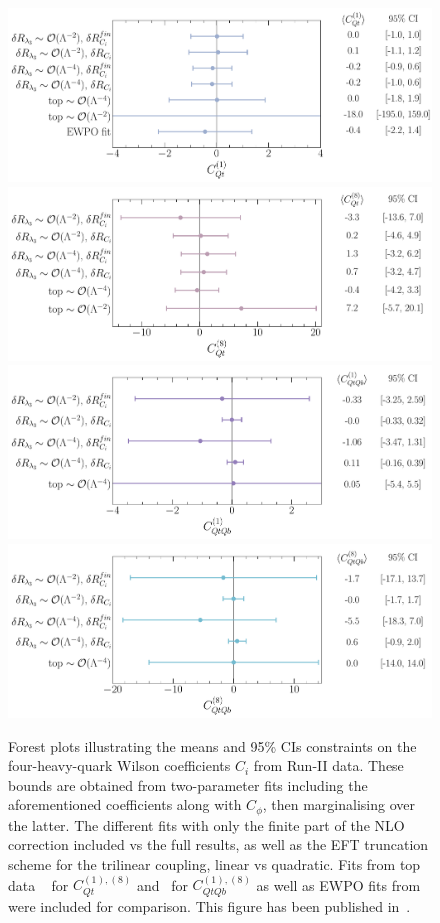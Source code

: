 	\begin{figure}[htpb!]
		\vspace*{-0.5cm}
		\begin{center}
			\includegraphics[width=0.75\linewidth]{fig/uebeblick_Cqt1}
			\includegraphics[width=0.75\linewidth]{fig/uebeblick_Cqt8} 
			\includegraphics[width=0.75\linewidth]{fig/uebeblick_Cqtqb1}
			\includegraphics[width=0.75\linewidth]{fig/uebeblick_Cqtqb8}
		\end{center}
		\vspace*{-0.5cm}
		\caption{Forest plots illustrating the means and 95\% CIs constraints on the four-heavy-quark Wilson coefficients $C_i$ from Run-II data. These bounds are obtained from two-parameter fits including the aforementioned coefficients along with $C_\phi$, then marginalising over the latter. The different fits with only the finite part of the NLO correction included vs the full results, as well as the EFT truncation scheme for the trilinear coupling, linear vs quadratic. Fits from top data ~\cite{Ethier:2021bye} for $C_{Qt}^{(1),(8)}$ and~\cite{Hartland:2019bjb} for $C_{QtQb}^{(1),(8)}$ as well as EWPO fits from~\cite{Dawson:2022bxd} were included for comparison. This figure has been published in~\cite{Alasfar:2022zyr}.}
		\label{fig:summ4f}
	\end{figure}
